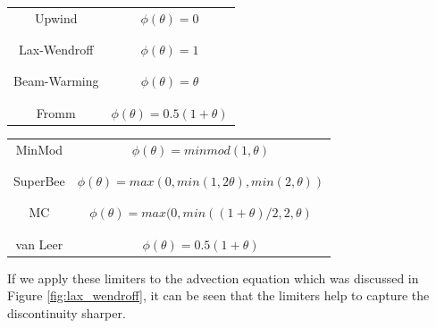 \documentclass[journal,onecolumn]{IEEEtran}
\begin{document}
\begin{center}
\begin{subtable}{\textwidth}
    \begin{tabular}{c|c}
         Upwind & $\phi(\theta) = 0$ \\
         \\
         \hline
         \\
         Lax-Wendroff & $\phi(\theta) = 1$ \\
         \\
         \hline
         \\
         Beam-Warming & $\phi(\theta) = \theta$ \\
         \\
         \hline
         \\
         Fromm & $\phi(\theta) = 0.5(1+\theta)$
    \end{tabular}
\end{subtable}
\begin{subtable}{\textwidth}
    \begin{tabular}{c|c}
     MinMod & $\phi(\theta) = minmod(1, \theta)$ 
     \\ \\
     \hline
     \\
     SuperBee & $\phi(\theta) = max(0, min(1, 2\theta), min(2, \theta))$ 
     \\ \\
     \hline
     \\
     MC & $\phi(\theta) = max(0, min((1 + \theta)/2, 2, \theta)$
     \\ \\
     \hline
     \\
     van Leer & $\phi(\theta) = 0.5(1+\theta)$
\end{tabular}

\end{subtable}
\end{center}

If we apply these limiters to the advection equation which was discussed in Figure \ref{fig:lax_wendroff}, it can be seen that the limiters help to capture the discontinuity sharper.
\end{document}
